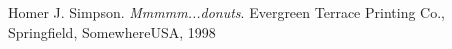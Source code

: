 \begin{thebibliography}{50}
   Homer J. Simpson. \textsl{Mmmmm...donuts}.
		Evergreen Terrace Printing Co., Springfield, SomewhereUSA, 1998
\end{thebibliography}
